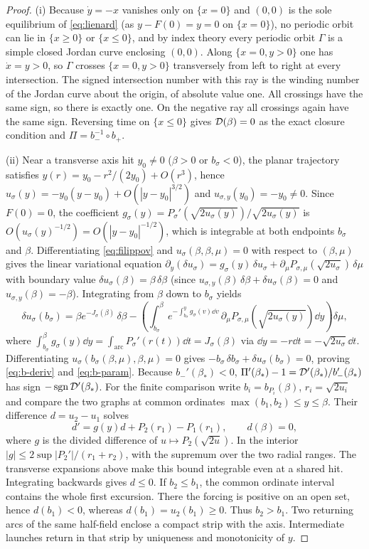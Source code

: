 \begin{proof}
(i) Because $\dot{y}=-x$ vanishes only on $\{x=0\}$ and $(0,0)$ is the sole equilibrium of
\eqref{eq:lienard} (as $y-F(0)=y=0$ on $\{x=0\}$), no periodic orbit can lie in $\{x\ge 0\}$ or
$\{x\le 0\}$, and by index theory every periodic orbit $\Gamma$ is a simple closed Jordan curve
enclosing $(0,0)$. Along $\{x=0,y>0\}$ one has $\dot{x}=y>0$, so $\Gamma$ crosses $\{x=0,y>0\}$
transversely from left to right at every intersection. The signed intersection number with this ray is
the winding number of
the Jordan curve about the origin, of absolute value one. All crossings
have the same sign, so there is exactly one. On the negative ray all
crossings again have the same sign. Reversing time on $\{x\le 0\}$ gives $\mathcal{D}(\beta)=0$ as the exact
closure condition and $\Pi=b_-^{-1}\circ b_+$.

(ii) Near a transverse axis hit $y_0\ne 0$ ($\beta>0$ or $b_\sigma<0$), the planar trajectory
satisfies $y(r)=y_0-r^2/(2y_0)+O(r^3)$, hence $u_\sigma(y)=-y_0(y-y_0)+O(|y-y_0|^{3/2})$ and
$u_{\sigma,y}(y_0)=-y_0\ne 0$. Since $F(0)=0$, the coefficient
$g_\sigma(y)=P_\sigma'(\sqrt{2u_\sigma(y)})/\sqrt{2u_\sigma(y)}$ is
$O(u_\sigma(y)^{-1/2})=O(|y-y_0|^{-1/2})$, which is integrable at both endpoints $b_\sigma$ and
$\beta$. Differentiating \eqref{eq:filippov} and $u_\sigma(\beta,\beta,\mu)=0$ with respect to
$(\beta,\mu)$ gives the linear variational equation $\partial_y(\delta u_\sigma)=g_\sigma(y)\,\delta
u_\sigma + \partial_\mu P_{\sigma,\mu}(\sqrt{2u_\sigma})\,\delta\mu$ with boundary value $\delta
u_\sigma(\beta)=\beta\,\delta\beta$ (since $u_{\sigma,y}(\beta)\,\delta\beta+\delta u_\sigma(\beta)=0$
and $u_{\sigma,y}(\beta)=-\beta$). Integrating from $\beta$ down to $b_\sigma$ yields
\[
  \delta u_\sigma(b_\sigma) = \beta e^{-J_\sigma(\beta)}\,\delta\beta - \left(\int_{b_\sigma}^\beta
  e^{-\int_{b_\sigma}^y g_\sigma(v)\dd v}\,\partial_\mu P_{\sigma,\mu}(\sqrt{2u_\sigma(y)})\dd
  y\right)\delta\mu,
\]
where $\int_{b_\sigma}^\beta g_\sigma(y)\dd y=\int_{\mathrm{arc}}P_\sigma'(r(t))\dd t=J_\sigma(\beta)$
via $\dd y=-r\dd t=-\sqrt{2u_\sigma}\dd t$. Differentiating
$u_\sigma(b_\sigma(\beta,\mu),\beta,\mu)=0$ gives $-b_\sigma\,\delta b_\sigma+\delta
u_\sigma(b_\sigma)=0$, proving \eqref{eq:b-deriv} and \eqref{eq:b-param}. Because $b_-'(\beta_*)<0$,
$\Pi'(\beta_*)-1=\mathcal{D}'(\beta_*)/b_-'(\beta_*)$ has sign $-\operatorname{sgn}\mathcal{D}'(\beta_*)$. For the finite comparison write
$b_i=b_{P_i}(\beta)$, $r_i=\sqrt{2u_i}$ and compare the two graphs
at common ordinates $\max(b_1,b_2)\le y\le\beta$. Their difference
$d=u_2-u_1$ solves
\[
 d'=g(y)d+P_2(r_1)-P_1(r_1),\qquad d(\beta)=0,
\]
where $g$ is the divided difference of $u\mapsto P_2(\sqrt{2u})$.
In the interior $|g|\le 2\sup|P_2'|/(r_1+r_2)$, with the supremum
over the two radial ranges. The transverse expansions above make
this bound integrable even at a shared hit. Integrating backwards
gives $d\le0$. If $b_2\le b_1$, the common ordinate interval contains
the whole first excursion. There the forcing is positive on an open
set, hence $d(b_1)<0$, whereas $d(b_1)=u_2(b_1)\ge0$. Thus $b_2>b_1$.
Two returning arcs of the same
half-field enclose a compact strip with the axis. Intermediate launches
return in that strip by uniqueness and monotonicity of $y$.


\end{proof}
